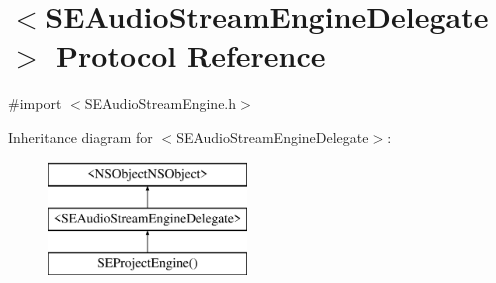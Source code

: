 \hypertarget{protocol_s_e_audio_stream_engine_delegate-p}{\section{$<$S\-E\-Audio\-Stream\-Engine\-Delegate$>$ Protocol Reference}
\label{protocol_s_e_audio_stream_engine_delegate-p}
}


{\ttfamily \#import $<$S\-E\-Audio\-Stream\-Engine.\-h$>$}

Inheritance diagram for $<$S\-E\-Audio\-Stream\-Engine\-Delegate$>$\-:\begin{figure}[H]
\begin{center}
\leavevmode
\includegraphics[height=3.000000cm]{protocol_s_e_audio_stream_engine_delegate-p}
\end{center}
\end{figure}
